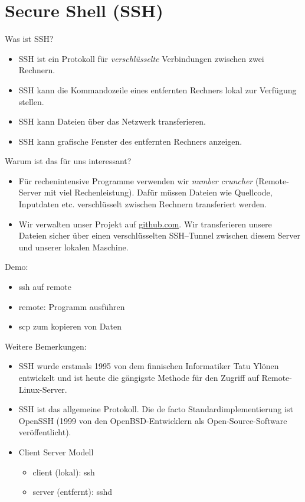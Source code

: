 \section{Secure Shell (SSH)}
Was ist SSH?
\begin{itemize}
	\item SSH ist ein Protokoll für \textit{verschlüsselte} Verbindungen zwischen zwei Rechnern.
	\item SSH kann die Kommandozeile eines entfernten Rechners lokal zur Verfügung stellen.
	\item SSH kann Dateien über das Netzwerk transferieren.
	\item SSH kann grafische Fenster des entfernten Rechners anzeigen.
\end{itemize}
Warum ist das für uns interessant?
\begin{itemize}
	\item Für rechenintensive Programme verwenden wir \textit{number cruncher} (Remote-Server mit viel Rechenleistung). Dafür müssen Dateien wie Quellcode, Inputdaten etc. verschlüsselt zwischen Rechnern transferiert werden.
	\item Wir verwalten unser Projekt auf \url{github.com}. Wir transferieren unsere Dateien sicher über einen verschlüsselten SSH--Tunnel zwischen diesem Server und unserer lokalen Maschine. 
\end{itemize}
Demo:
\begin{itemize}
	\item  ssh auf remote
\item remote: Programm ausführen
 \item scp zum kopieren von Daten
\end{itemize}
Weitere Bemerkungen:
\begin{itemize}
	\item SSH wurde erstmals 1995 von dem finnischen Informatiker Tatu Ylönen entwickelt und ist heute die gängigste Methode für den Zugriff auf Remote-Linux-Server.
	\item SSH ist das allgemeine Protokoll. Die de facto Standardimplementierung ist OpenSSH (1999 von den OpenBSD-Entwicklern als Open-Source-Software veröffentlicht).
	\item Client Server Modell
	\begin{itemize}
		\item client (lokal): ssh
		\item server (entfernt): sshd
	\end{itemize}
\end{itemize}
